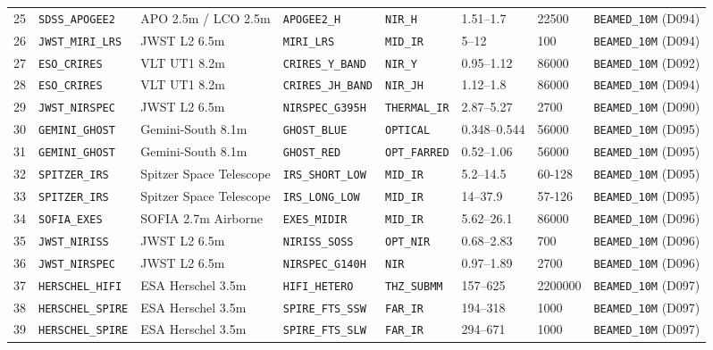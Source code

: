 \documentclass[twocolumn,10pt]{article}
\begin{document}
\begin{table}[!ht]
{\begin{tabular}{rlllllll}
25 & \texttt{SDSS\_APOGEE2} & APO 2.5m / LCO 2.5m & \texttt{APOGEE2\_H} & \texttt{NIR\_H} & 1.51--1.7 & 22500 & \texttt{BEAMED\_10M} (D094) \\
26 & \texttt{JWST\_MIRI\_LRS} & JWST L2 6.5m & \texttt{MIRI\_LRS} & \texttt{MID\_IR} & 5--12 & 100 & \texttt{BEAMED\_10M} (D094) \\
27 & \texttt{ESO\_CRIRES} & VLT UT1 8.2m & \texttt{CRIRES\_Y\_BAND} & \texttt{NIR\_Y} & 0.95--1.12 & 86000 & \texttt{BEAMED\_10M} (D092) \\
28 & \texttt{ESO\_CRIRES} & VLT UT1 8.2m & \texttt{CRIRES\_JH\_BAND} & \texttt{NIR\_JH} & 1.12--1.8 & 86000 & \texttt{BEAMED\_10M} (D094) \\
29 & \texttt{JWST\_NIRSPEC} & JWST L2 6.5m & \texttt{NIRSPEC\_G395H} & \texttt{THERMAL\_IR} & 2.87--5.27 & 2700 & \texttt{BEAMED\_10M} (D090) \\
30 & \texttt{GEMINI\_GHOST} & Gemini-South 8.1m & \texttt{GHOST\_BLUE} & \texttt{OPTICAL} & 0.348--0.544 & 56000 & \texttt{BEAMED\_10M} (D095) \\
31 & \texttt{GEMINI\_GHOST} & Gemini-South 8.1m & \texttt{GHOST\_RED} & \texttt{OPT\_FARRED} & 0.52--1.06 & 56000 & \texttt{BEAMED\_10M} (D095) \\
32 & \texttt{SPITZER\_IRS} & Spitzer Space Telescope & \texttt{IRS\_SHORT\_LOW} & \texttt{MID\_IR} & 5.2--14.5 & 60-128 & \texttt{BEAMED\_10M} (D095) \\
33 & \texttt{SPITZER\_IRS} & Spitzer Space Telescope & \texttt{IRS\_LONG\_LOW} & \texttt{MID\_IR} & 14--37.9 & 57-126 & \texttt{BEAMED\_10M} (D095) \\
34 & \texttt{SOFIA\_EXES} & SOFIA 2.7m Airborne & \texttt{EXES\_MIDIR} & \texttt{MID\_IR} & 5.62--26.1 & 86000 & \texttt{BEAMED\_10M} (D096) \\
35 & \texttt{JWST\_NIRISS} & JWST L2 6.5m & \texttt{NIRISS\_SOSS} & \texttt{OPT\_NIR} & 0.68--2.83 & 700 & \texttt{BEAMED\_10M} (D096) \\
36 & \texttt{JWST\_NIRSPEC} & JWST L2 6.5m & \texttt{NIRSPEC\_G140H} & \texttt{NIR} & 0.97--1.89 & 2700 & \texttt{BEAMED\_10M} (D096) \\
37 & \texttt{HERSCHEL\_HIFI} & ESA Herschel 3.5m & \texttt{HIFI\_HETERO} & \texttt{THZ\_SUBMM} & 157--625 & 2200000 & \texttt{BEAMED\_10M} (D097) \\
38 & \texttt{HERSCHEL\_SPIRE} & ESA Herschel 3.5m & \texttt{SPIRE\_FTS\_SSW} & \texttt{FAR\_IR} & 194--318 & 1000 & \texttt{BEAMED\_10M} (D097) \\
39 & \texttt{HERSCHEL\_SPIRE} & ESA Herschel 3.5m & \texttt{SPIRE\_FTS\_SLW} & \texttt{FAR\_IR} & 294--671 & 1000 & \texttt{BEAMED\_10M} (D097) \\

\end{tabular}}
\end{table}
\end{document}
